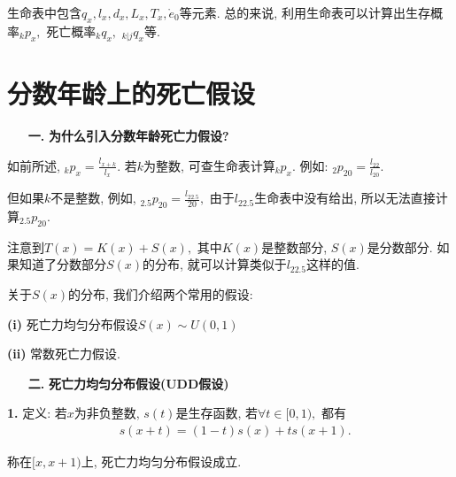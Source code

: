\documentclass[a4paper,openany, 10pt]{ctexbook}
\newcommand{\hei}{\CJKfamily{hei}}      %
\begin{document}
生命表中包含$q_x,l_x,d_x,L_x,T_x,\mathring{e}_0$等元素. 总的来说, 利用生命表可以计算出生存概率${}_kp_x,$ 死亡概率${}_kq_x,$ ${}_{k|j}q_x$等.
\newpage

\section{分数年龄上的死亡假设}
\begin{itemize}
    \item[{\bf\hei 一.}]{\bf\hei 为什么引入分数年龄死亡力假设?}
\end{itemize}

如前所述, $_{k}p_{x}=\frac{l_{x+k}}{l_{x}}.$ 若$k$为整数, 可查生命表计算$_{k}p_{x}.$ 例如: $_{2}p_{20}=\frac{l_{22}}{l_{20}}.$

但如果$k$不是整数, 例如, ${}_{2.5}p_{20}=\frac{l_{22.5}}{20},$ 由于$l_{22.5}$生命表中没有给出, 所以无法直接计算${}_{2.5}p_{20}.$


注意到$T(x)=K(x)+S(x),$ 其中$K(x)$是整数部分, $S(x)$是分数部分. 如果知道了分数部分$S(x)$的分布, 就可以计算类似于$l_{22.5}$这样的值.


关于$S(x)$的分布, 我们介绍两个常用的假设:

{\rm\bf(i)} 死亡力均匀分布假设$S(x)\sim U(0,1)$

{\rm\bf(ii)} 常数死亡力假设.

\begin{itemize}
    \item[{\bf\hei 二.}]{\bf\hei 死亡力均匀分布假设(UDD假设)}
\end{itemize}

{\rm\bf1.} 定义: 若$x$为非负整数, $s(t)$是生存函数, 若$\forall t\in [0,1),$ 都有
\begin{align}\label{tula}
     & s(x+t)=(1-t)s(x)+ts(x+1).
\end{align}

称在$[x,x+1)$上, 死亡力均匀分布假设成立.
\end{document}
